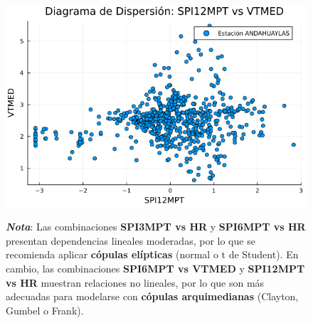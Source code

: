 \begin{figure}[H]
\begin{minipage}{0.33\textwidth}
    \includegraphics[width=\linewidth]{Capitulos/Scaterplot/ANDAHUAYLAS_SPI12MPT_vs_VTMED.png}
\end{minipage}
\vspace{0.1em}
\begin{flushleft}
\label{fig:corr_and}
\footnotesize
\justifying
\textbf{\textit{Nota}}: Las combinaciones \textbf{SPI3MPT vs HR} y \textbf{SPI6MPT vs HR} presentan dependencias lineales moderadas, por lo que se recomienda aplicar \textbf{cópulas elípticas} (normal o t de Student). En cambio, las combinaciones \textbf{SPI6MPT vs VTMED} y \textbf{SPI12MPT vs HR} muestran relaciones no lineales, por lo que son más adecuadas para modelarse con \textbf{cópulas arquimedianas} (Clayton, Gumbel o Frank).
\end{flushleft}
\end{figure}






